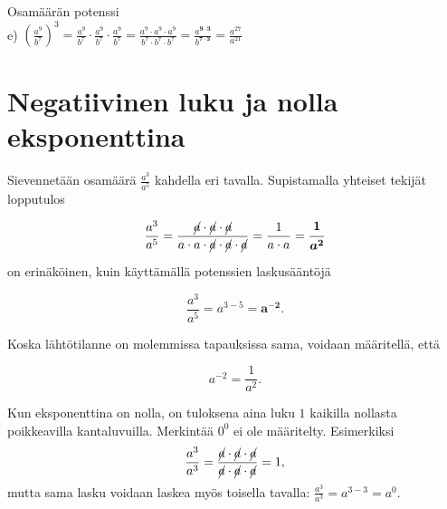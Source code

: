 Osamäärän potenssi\\
e) $\left(\frac{a^9}{b^7}\right)^3=\frac{a^9}{b^7}\cdot \frac{a^9}{b^7}\cdot \frac{a^9}{b^7}=\frac{a^9\cdot a^9\cdot a^9}{b^7\cdot b^7\cdot b^7}=\frac{a^{\mathbf{9\cdot 3}}}{b^{\mathbf{7\cdot 3}}}=\frac{a^{27}}{a^{21}}$

\section*{Negatiivinen luku ja nolla eksponenttina}

Sievennetään osamäärä $\frac{a^3}{a^5}$ kahdella eri tavalla. Supistamalla yhteiset tekijät lopputulos

\begin{equation*}
\frac{a^3}{a^5}=\frac{\cancel{a}\cdot \cancel{a}\cdot \cancel{a}}{a\cdot a\cdot \cancel{a}\cdot \cancel{a}\cdot \cancel{a}}=\frac{1}{a\cdot a}=\boldsymbol{\frac{1}{a^2}}
\end{equation*}

on erinäköinen, kuin käyttämällä potenssien laskusääntöjä

\begin{equation*}
\frac{a^3}{a^5}=a^{3-5}=\boldsymbol {a^{-2}}{.}
\end{equation*}

Koska lähtötilanne on molemmissa tapauksissa sama, voidaan määritellä, että

\begin{equation*}
	a^{-2}=\frac{1}{a^2}{.}
\end{equation*}


Kun eksponenttina on nolla, on tuloksena aina luku $1$ kaikilla nollasta poikkeavilla kantaluvuilla. Merkintää $0^0$ ei ole määritelty.
Esimerkiksi
\[\frac{a^3}{a^3}=\frac{\cancel{a}\cdot \cancel{a}\cdot \cancel{a}}{\cancel{a}\cdot \cancel{a}\cdot \cancel{a}}=1,\] mutta sama lasku voidaan laskea myös toisella tavalla:
$\frac{a^3}{a^3}=a^{3-3}=a^0$.




